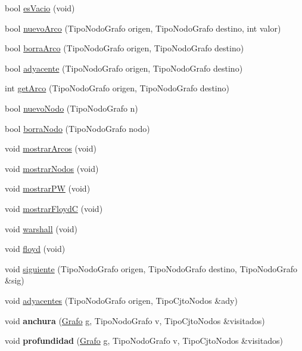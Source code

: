 \begin{CompactItemize}
\item 
bool \hyperlink{classGrafo_c6b3070591d565cab5efb6b5aac62bef}{esVacio} (void)
\item 
bool \hyperlink{classGrafo_ed8619656de5d16de0add75e3497e23e}{nuevoArco} (TipoNodoGrafo origen, TipoNodoGrafo destino, int valor)
\item 
bool \hyperlink{classGrafo_577730ec1abd068092a3c0947756bf3e}{borraArco} (TipoNodoGrafo origen, TipoNodoGrafo destino)
\item 
bool \hyperlink{classGrafo_23ead320b4f7eb49a8b470d998ed37c2}{adyacente} (TipoNodoGrafo origen, TipoNodoGrafo destino)
\item 
int \hyperlink{classGrafo_f657b527f15fdc5c743b1dd1bf965789}{getArco} (TipoNodoGrafo origen, TipoNodoGrafo destino)
\item 
bool \hyperlink{classGrafo_05878b3e96fe9d89dc7939187e1d96d2}{nuevoNodo} (TipoNodoGrafo n)
\item 
bool \hyperlink{classGrafo_ed70a046c1d864a2e1532cbca4216896}{borraNodo} (TipoNodoGrafo nodo)
\item 
void \hyperlink{classGrafo_44f6f4aca2763cfae2da60a489692423}{mostrarArcos} (void)
\item 
void \hyperlink{classGrafo_84b7da0227f81b94681bc3cb629f3035}{mostrarNodos} (void)
\item 
void \hyperlink{classGrafo_4c7af7b8f7cb4423836f45dd62d9fff2}{mostrarPW} (void)
\item 
void \hyperlink{classGrafo_3ca9a9b3ad1c598442d05a528a75a5da}{mostrarFloydC} (void)
\item 
void \hyperlink{classGrafo_8cbe645ba4ee198c1777186bf2b2a2d7}{warshall} (void)
\item 
void \hyperlink{classGrafo_fb0510598fcefea15428e0f2cf1144dc}{floyd} (void)
\item 
void \hyperlink{classGrafo_c1517bf52e85a5dd1052f6f2b6f5b9a3}{siguiente} (TipoNodoGrafo origen, TipoNodoGrafo destino, TipoNodoGrafo \&sig)
\item 
void \hyperlink{classGrafo_416d9891de5c525d84875a922cf66a5a}{adyacentes} (TipoNodoGrafo origen, TipoCjtoNodos \&ady)
\item 
\hypertarget{classGrafo_2446def9aec3af9e6c7153bb7a5e8e8f}{
void \textbf{anchura} (\hyperlink{classGrafo}{Grafo} g, TipoNodoGrafo v, TipoCjtoNodos \&visitados)}
\label{classGrafo_2446def9aec3af9e6c7153bb7a5e8e8f}

\item 
\hypertarget{classGrafo_fc1e329960921eef323e53995ffebe9c}{
void \textbf{profundidad} (\hyperlink{classGrafo}{Grafo} g, TipoNodoGrafo v, TipoCjtoNodos \&visitados)}
\label{classGrafo_fc1e329960921eef323e53995ffebe9c}


\end{CompactItemize}
